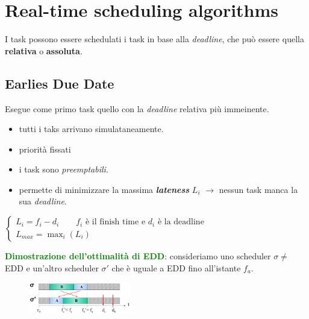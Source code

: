\chapter{Real-time scheduling algorithms}
I task possono essere schedulati i task in base alla \textit{deadline}, che può essere quella \textbf{relativa} o \textbf{assoluta}.

\section{Earlies Due Date}
Esegue come primo task quello con la \textit{deadline} relativa più immeinente.
\begin{itemize}
    \item tutti i taks arrivano simulataneamente.
    \item priorità fissati\item i task sono \textit{preemptabili}.
    \item permette di minimizzare la massima \textbf{\textit{lateness}} $L_i$ $\rightarrow$ nessun task manca la sua \textit{deadline}.
\end{itemize}
\begin{center}
    \begin{math}
        \begin{cases}
            L_i = f_i - d_i \qquad f_i \text{ è il finish time e } d_i \text{ è la deadline} \\
            L_{max} = \max_i(L_i)
        \end{cases}
    \end{math}
\end{center}

\newpage

\textcolor{green}{\textbf{Dimostrazione dell'ottimalità di EDD}}: consideriamo uno scheduler $\sigma \neq$ EDD e un'altro scheduler $\sigma'$ che è uguale a EDD fino all'istante $f_a$.
\begin{figure}[h]
    \centering
    \includegraphics[width=0.4\textwidth]{img/edd_opt}
\end{figure}